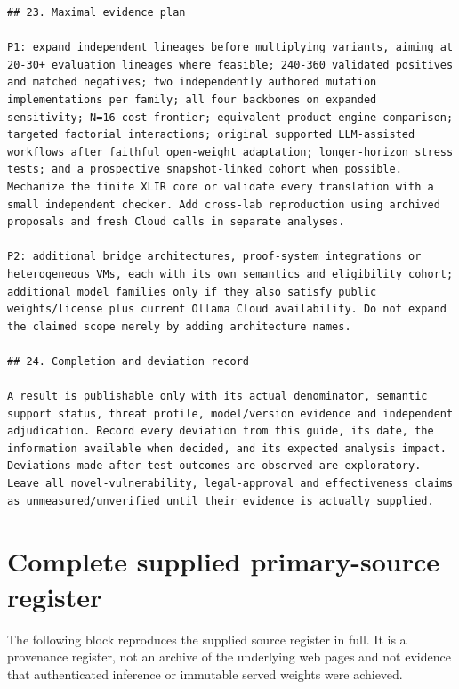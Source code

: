 \documentclass[11pt,a4paper]{article}
\begin{document}
\begin{verbatim}
## 23. Maximal evidence plan

P1: expand independent lineages before multiplying variants, aiming at 20-30+ evaluation lineages where feasible; 240-360 validated positives and matched negatives; two independently authored mutation implementations per family; all four backbones on expanded sensitivity; N=16 cost frontier; equivalent product-engine comparison; targeted factorial interactions; original supported LLM-assisted workflows after faithful open-weight adaptation; longer-horizon stress tests; and a prospective snapshot-linked cohort when possible. Mechanize the finite XLIR core or validate every translation with a small independent checker. Add cross-lab reproduction using archived proposals and fresh Cloud calls in separate analyses.

P2: additional bridge architectures, proof-system integrations or heterogeneous VMs, each with its own semantics and eligibility cohort; additional model families only if they also satisfy public weights/license plus current Ollama Cloud availability. Do not expand the claimed scope merely by adding architecture names.

## 24. Completion and deviation record

A result is publishable only with its actual denominator, semantic support status, threat profile, model/version evidence and independent adjudication. Record every deviation from this guide, its date, the information available when decided, and its expected analysis impact. Deviations made after test outcomes are observed are exploratory. Leave all novel-vulnerability, legal-approval and effectiveness claims as unmeasured/unverified until their evidence is actually supplied.
\end{verbatim}

\section{Complete supplied primary-source register}
\label{app:sources}

The following block reproduces the supplied source register in full. It is a provenance register, not an archive of the underlying web pages and not evidence that authenticated inference or immutable served weights were achieved.
\end{document}
